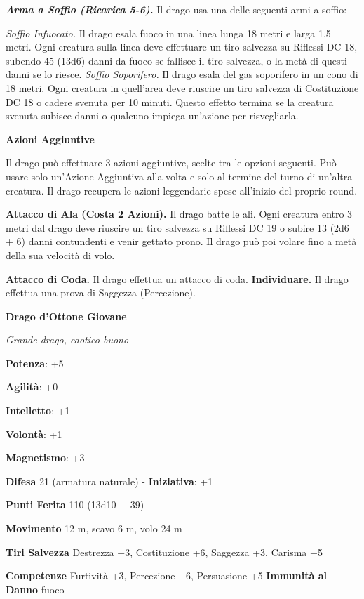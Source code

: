 \begin{multicols}{2}
\emph{\textbf{Arma a Soffio (Ricarica 5-6).}} Il drago usa una delle
seguenti armi a soffio:

\emph{Soffio Infuocato.} Il drago esala fuoco in una linea lunga 18
metri e larga 1,5 metri. Ogni creatura sulla linea deve effettuare un
tiro salvezza su Riflessi DC 18, subendo 45 (13d6) danni da fuoco se
fallisce il tiro salvezza, o la metà di questi danni se lo riesce.
\emph{Soffio Soporifero.} Il drago esala del gas soporifero in un cono
di 18 metri. Ogni creatura in quell'area deve riuscire un tiro salvezza
di Costituzione DC 18 o cadere svenuta per 10 minuti. Questo effetto
termina se la creatura svenuta subisce danni o qualcuno impiega
un'azione per risvegliarla.

\textbf{Azioni Aggiuntive}

Il drago può effettuare 3 azioni aggiuntive, scelte tra le opzioni
seguenti. Può usare solo un'Azione Aggiuntiva alla volta e solo al
termine del turno di un'altra creatura. Il drago recupera le azioni
leggendarie spese all'inizio del proprio round.

\textbf{Attacco di Ala (Costa 2 Azioni).} Il drago batte le ali. Ogni
creatura entro 3 metri dal drago deve riuscire un tiro salvezza su Riflessi DC 19 o subire 13 (2d6 + 6) danni contundenti e venir gettato
prono. Il drago può poi volare fino a metà della sua velocità di volo.

\textbf{Attacco di Coda.} Il drago effettua un attacco di coda.
\textbf{Individuare.} Il drago effettua una prova di Saggezza
(Percezione).



\textbf{Drago d'Ottone Giovane}

\emph{Grande drago, caotico buono}

\textbf{Potenza}: +5

\textbf{Agilità}: +0

\textbf{Intelletto}: +1

\textbf{Volontà}: +1

\textbf{Magnetismo}: +3

\textbf{Difesa} 21 (armatura naturale) - \textbf{Iniziativa}: +1

\textbf{Punti Ferita} 110 (13d10 + 39)

\textbf{Movimento} 12 m, scavo 6 m, volo 24 m

\textbf{Tiri Salvezza} Destrezza +3, Costituzione +6, Saggezza +3,
Carisma +5

\textbf{Competenze} Furtività +3, Percezione +6, Persuasione +5
\textbf{Immunità al Danno} fuoco


\end{multicols}
